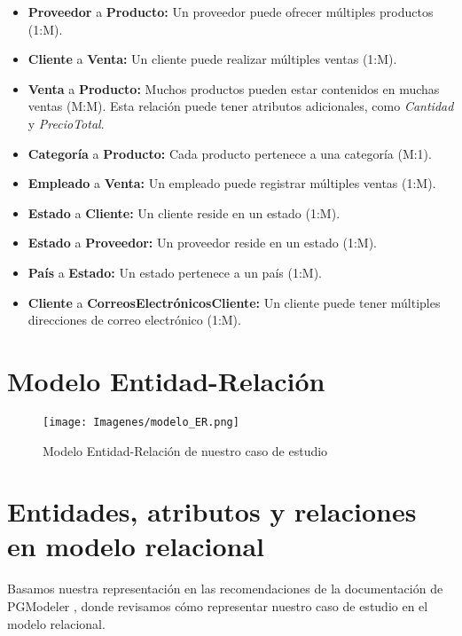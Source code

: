 \documentclass[10pt,openany]{book}
\begin{document}
\begin{itemize}
    \item \textbf{Proveedor} a \textbf{Producto:} Un proveedor puede ofrecer múltiples productos (1:M).
    \item \textbf{Cliente} a \textbf{Venta:} Un cliente puede realizar múltiples ventas (1:M).
    \item \textbf{Venta} a \textbf{Producto:} Muchos productos pueden estar contenidos en muchas ventas (M:M). Esta relación puede tener atributos adicionales, como \textit{Cantidad} y \textit{PrecioTotal}.
    \item \textbf{Categoría} a \textbf{Producto:} Cada producto pertenece a una categoría (M:1).
    \item \textbf{Empleado} a \textbf{Venta:} Un empleado puede registrar múltiples ventas (1:M).
    \item \textbf{Estado} a \textbf{Cliente:} Un cliente reside en un estado (1:M).
    \item \textbf{Estado} a \textbf{Proveedor:} Un proveedor reside en un estado (1:M).
    \item \textbf{País} a \textbf{Estado:} Un estado pertenece a un país (1:M).
    \item \textbf{Cliente} a \textbf{CorreosElectrónicosCliente:} Un cliente puede tener múltiples direcciones de correo electrónico (1:M).
\end{itemize}


\section{Modelo Entidad-Relación}

\begin{figure}[H]
    \begin{center}
        \texttt{[image: Imagenes/modelo\_ER.png]}
        \caption{Modelo Entidad-Relación de nuestro caso de estudio}
    \end{center}
\end{figure}

\section{Entidades, atributos y relaciones en modelo relacional}

Basamos nuestra representación en las recomendaciones de la documentación de PGModeler \nocite{pgModeler_Relationships}, donde revisamos cómo representar nuestro caso de estudio en el modelo relacional.
\end{document}
